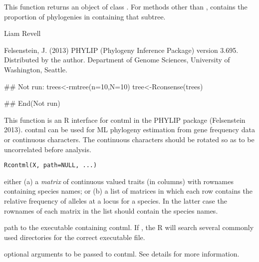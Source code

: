 \documentclass[a4paper]{book}
\begin{document}
%
\begin{Value}
This function returns an object of class . For methods other than ,  contains the proportion of phylogenies in  containing that subtree.
\end{Value}
%
\begin{Author}\relax
Liam Revell 
\end{Author}
%
\begin{References}\relax
Felsenstein, J. (2013) PHYLIP (Phylogeny Inference Package) version 3.695. Distributed by the author. Department of Genome Sciences, University of Washington, Seattle.
\end{References}
%
\begin{Examples}
\begin{ExampleCode}
## Not run: 
trees<-rmtree(n=10,N=10)
tree<-Rconsense(trees)

## End(Not run)
\end{ExampleCode}
\end{Examples}
%
\begin{Description}\relax
This function is an R interface for contml in the PHYLIP package (Felsenstein 2013). contml can be used for ML phylogeny estimation from gene frequency data or continuous characters. The continuous characters should be rotated so as to be uncorrelated before analysis.
\end{Description}
%
\begin{Usage}
\begin{verbatim}
Rcontml(X, path=NULL, ...)
\end{verbatim}
\end{Usage}
%
\begin{Arguments}
\begin{ldescription}
\item[\code{X}] either (a) a \emph{matrix} of continuous valued traits (in columns) with rownames containing species names; or (b) a list of matrices in which each row contains the relative frequency of alleles at a locus for a species. In the latter case the rownames of each matrix in the list should contain the species names.
\item[\code{path}] path to the executable containing contml. If , the R will search several commonly used directories for the correct executable file.
\item[\code{...}] optional arguments to be passed to contml. See details for more information.
\end{ldescription}
\end{Arguments}
\end{document}
